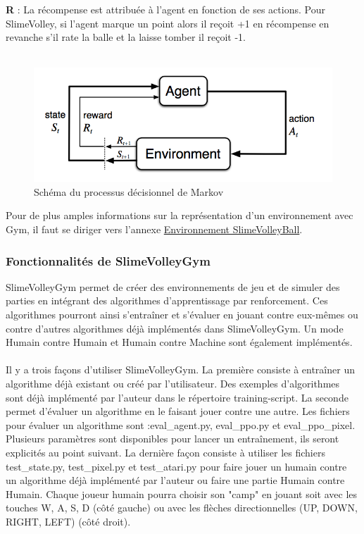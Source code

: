 \documentclass[11pt, a4paper]{article}
\begin{document}
\noindent \textbf{R} : La récompense est attribuée à l'agent en fonction de ses actions. Pour SlimeVolley, si l'agent marque un point alors il reçoit +1 en récompense en revanche s'il rate la balle et la laisse tomber il reçoit -1. \\\\

\begin{figure}[H]
	\centering
	\includegraphics[scale=0.5]{images/agent_environment_MDP.png}
	\caption {Schéma du processus décisionnel de Markov \cite{openaigym}}
\end{figure}


\noindent Pour de plus amples informations sur la représentation d'un environnement avec Gym, il faut se diriger vers l'annexe \href{/annexes/Environnement_SlimeVolleyBall.pdf}{Environnement SlimeVolleyBall}.


\subsubsection{Fonctionnalités de SlimeVolleyGym}
SlimeVolleyGym permet de créer des environnements de jeu et de simuler des parties en intégrant des algorithmes d'apprentissage par renforcement. Ces algorithmes pourront ainsi s’entraîner et s'évaluer en jouant contre eux-mêmes ou contre d'autres algorithmes déjà implémentés dans SlimeVolleyGym. Un mode Humain contre Humain et Humain contre Machine sont également implémentés. \\ \\

Il y a trois façons d'utiliser SlimeVolleyGym. La première consiste à entraîner un algorithme déjà existant ou créé par l'utilisateur. Des exemples d'algorithmes sont déjà implémenté par l'auteur dans le répertoire training-script.
La seconde permet d'évaluer un algorithme en le faisant jouer contre une autre. Les fichiers pour évaluer un algorithme sont :eval\_agent.py, eval\_ppo.py et eval\_ppo\_pixel. Plusieurs paramètres sont disponibles pour lancer un entraînement, ils seront explicités au point suivant.
La dernière façon consiste à utiliser les fichiers test\_state.py, test\_pixel.py et test\_atari.py pour faire jouer un humain contre un algorithme déjà implémenté par l'auteur ou faire une partie Humain contre Humain. Chaque joueur humain pourra choisir son "camp" en jouant soit avec les touches W, A, S, D (côté gauche) ou avec les flèches directionnelles (UP, DOWN, RIGHT, LEFT) (côté droit).\\ \\
\end{document}

